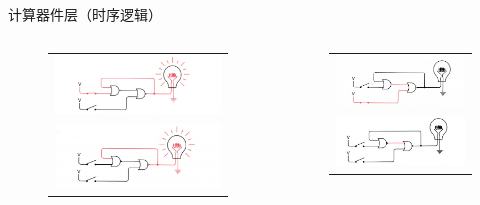 \documentclass[UTF8]{ctexbeamer}
\begin{document}
\begin{frame}{计算器件层（时序逻辑）}
\begin{columns}
\begin{column}{0.5\linewidth}
\begin{figure}
\centering
\begin{tabular}{c}
\includegraphics[width=\linewidth]{fig/Lecture2/ff_1.jpg}\\
\includegraphics[width=\linewidth]{fig/Lecture2/ff_2.jpg}
\end{tabular}
\end{figure}
\end{column}
\pause
\begin{column}{0.5\linewidth}
\begin{figure}
\centering
\begin{tabular}{c}
\includegraphics[width=\linewidth]{fig/Lecture2/ff_3.jpg}\\
\includegraphics[width=\linewidth]{fig/Lecture2/ff_4.jpg}

\end{tabular}
\end{figure}
\end{column}
\end{columns}
\end{frame}
\end{document}

